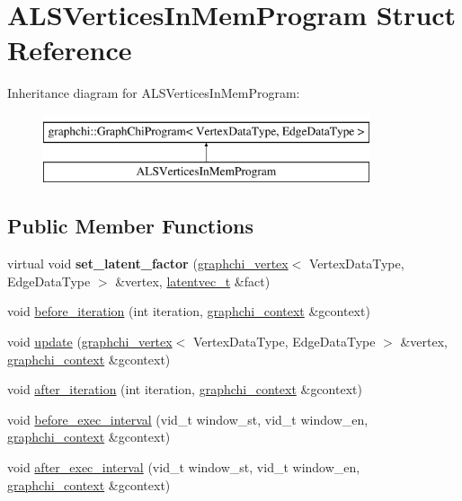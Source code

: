 \hypertarget{struct_a_l_s_vertices_in_mem_program}{\section{A\-L\-S\-Vertices\-In\-Mem\-Program Struct Reference}
\label{struct_a_l_s_vertices_in_mem_program}
}
Inheritance diagram for A\-L\-S\-Vertices\-In\-Mem\-Program\-:\begin{figure}[H]
\begin{center}
\leavevmode
\includegraphics[height=2.000000cm]{struct_a_l_s_vertices_in_mem_program}
\end{center}
\end{figure}
\subsection*{Public Member Functions}
\begin{DoxyCompactItemize}
\item 
\hypertarget{struct_a_l_s_vertices_in_mem_program_aa10200a9a239d9816e51f876985aec3c}{virtual void {\bfseries set\-\_\-latent\-\_\-factor} (\hyperlink{classgraphchi_1_1graphchi__vertex}{graphchi\-\_\-vertex}$<$ Vertex\-Data\-Type, Edge\-Data\-Type $>$ \&vertex, \hyperlink{structlatentvec__t}{latentvec\-\_\-t} \&fact)}\label{struct_a_l_s_vertices_in_mem_program_aa10200a9a239d9816e51f876985aec3c}

\item 
void \hyperlink{struct_a_l_s_vertices_in_mem_program_ad9a6a2fdf9c1e996b89ebef238a45de1}{before\-\_\-iteration} (int iteration, \hyperlink{structgraphchi_1_1graphchi__context}{graphchi\-\_\-context} \&gcontext)
\item 
void \hyperlink{struct_a_l_s_vertices_in_mem_program_a79ab59ee2ac716c0a4c7489c5bffe987}{update} (\hyperlink{classgraphchi_1_1graphchi__vertex}{graphchi\-\_\-vertex}$<$ Vertex\-Data\-Type, Edge\-Data\-Type $>$ \&vertex, \hyperlink{structgraphchi_1_1graphchi__context}{graphchi\-\_\-context} \&gcontext)
\item 
void \hyperlink{struct_a_l_s_vertices_in_mem_program_ad5f96d529e7b579610944c660269b136}{after\-\_\-iteration} (int iteration, \hyperlink{structgraphchi_1_1graphchi__context}{graphchi\-\_\-context} \&gcontext)
\item 
void \hyperlink{struct_a_l_s_vertices_in_mem_program_a36db7afcd9ec22c1ddbe378f91f0fe5e}{before\-\_\-exec\-\_\-interval} (vid\-\_\-t window\-\_\-st, vid\-\_\-t window\-\_\-en, \hyperlink{structgraphchi_1_1graphchi__context}{graphchi\-\_\-context} \&gcontext)
\item 
void \hyperlink{struct_a_l_s_vertices_in_mem_program_a0a71542edb0835aa1bedf5cc1ef83975}{after\-\_\-exec\-\_\-interval} (vid\-\_\-t window\-\_\-st, vid\-\_\-t window\-\_\-en, \hyperlink{structgraphchi_1_1graphchi__context}{graphchi\-\_\-context} \&gcontext)
\end{DoxyCompactItemize}
